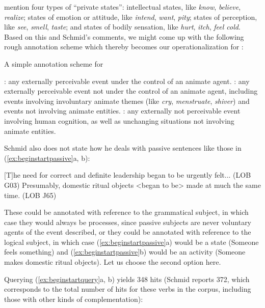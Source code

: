 \citet[202--203]{quirk_comprehensive_1985} mention four types of ``private states'': intellectual states, like \textit{know}, \textit{believe}, \textit{realize}; states of emotion or attitude, like \textit{intend}, \textit{want}, \textit{pity}; states of perception, like \textit{see}, \textit{smell}, \textit{taste}; and states of bodily sensation, like \textit{hurt}, \textit{itch}, \textit{feel cold}. Based on this and Schmid's comments, we might come up with the following rough annotation scheme which thereby becomes our operationalization for :

\begin{exe}
\ex A simple annotation scheme for 
\begin{xlist} 
\label{ex:aktionsart}
\ex {}: any externally perceivable event under the control of an animate agent.
\ex {}: any externally perceivable event not under the control of an animate agent, including events involving involuntary animate themes (like \textit{cry}, \textit{menstruate}, \textit{shiver}) and events not involving animate entities.
\ex {}: any externally not perceivable event involving human cognition, as well as unchanging situations not involving animate entities.
\end{xlist}
\end{exe}

Schmid also does not state how he deals with passive sentences like those in (\ref{ex:beginstartpassive}a, b):

\begin{exe}
\ex
\begin{xlist} 
\label{ex:beginstartpassive}
\ex $[$T$]$he need for correct and definite leadership began to be urgently felt... (LOB G03)
\ex Presumably, domestic ritual objects <began to be> made at much the same time. (LOB J65)
\end{xlist}
\end{exe}

These could be annotated with reference to the grammatical subject, in which case they would always be processes, since passive subjects are never voluntary agents of the event described, or they could be annotated with reference to the logical subject, in which case (\ref{ex:beginstartpassive}a) would be a state (Someone feels something) and (\ref{ex:beginstartpassive}b) would be an activity (Someone makes domestic ritual objects). Let us choose the second option here.

Querying (\ref{ex:beginstartquery}a, b) yields 348 hits (Schmid reports 372, which corresponds to the total number of hits for these verbs in the corpus, including those with other kinds of complementation):

